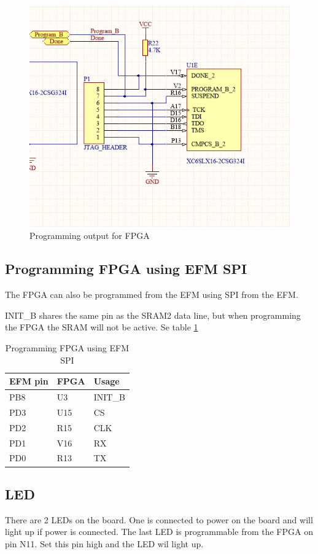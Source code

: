 \begin{figure}
    \includegraphics[width=\linewidth]{img/FPGA_Programmer.png}
    \caption{Programming output for FPGA}
    \label{fig:fpgaprogrammer}
\end{figure}

\subsection{Programming FPGA using EFM SPI}
The FPGA can also be programmed from the EFM using SPI from the EFM. 

INIT\_B shares the same pin as the SRAM2 data line, but when programming the FPGA the SRAM will not be active. Se table \ref{tab:spiprogrammer}

\begin{table}[]
    \centering
    \label{tab:spiprogrammer}
    \begin{tabular}{lll}
        EFM pin & FPGA & Usage   \\
        \hline
        PB8     & U3   & INIT\_B \\
        PD3     & U15  & CS      \\
        PD2     & R15  & CLK     \\
        PD1     & V16  & RX      \\
        PD0     & R13  & TX
    \end{tabular}
    \caption{Programming FPGA using EFM SPI}
\end{table}
\subsection{LED}
There are 2 LEDs on the board. One is connected to power on the board and will light up if power is connected. The last LED is programmable from the FPGA on pin N11. Set this pin high and the LED wil light up.
